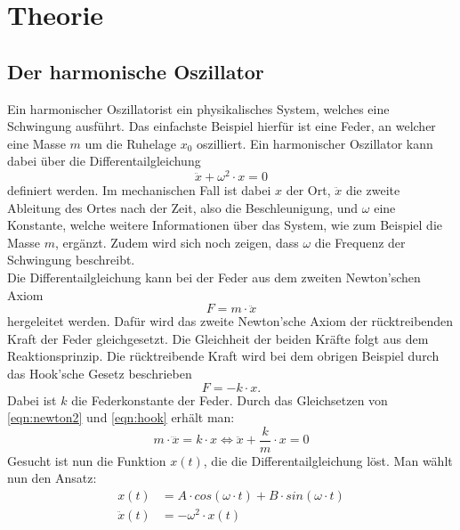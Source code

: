 \section{Theorie}
\label{sec:Theorie}
\subsection{Der harmonische Oszillator}
Ein harmonischer Oszillatorist ein physikalisches System, welches eine Schwingung ausführt. Das einfachste Beispiel
hierfür ist eine Feder, an welcher eine Masse  $m$ um die Ruhelage $x_0$ oszilliert.
Ein harmonischer Oszillator kann dabei über die Differentailgleichung
\begin{equation}
    \ddot{x}+\omega^2\cdot x=0 \label{eqn:harmOsz}
\end{equation}
definiert werden. Im mechanischen Fall ist dabei $x$ der Ort, $\ddot{x}$ die zweite Ableitung des Ortes nach der Zeit,
also die Beschleunigung, und $\omega$ eine Konstante, welche weitere Informationen über das System, wie zum Beispiel die 
Masse $m$, ergänzt. Zudem wird sich noch zeigen, dass $\omega$ die Frequenz der Schwingung beschreibt.
\\
Die Differentailgleichung kann bei der Feder aus dem zweiten Newton'schen Axiom
\begin{equation}
    F=m\cdot\ddot{x} \label{eqn:newton2}
\end{equation} 
hergeleitet werden. Dafür wird das zweite Newton'sche Axiom der rücktreibenden Kraft der Feder gleichgesetzt. Die 
Gleichheit der beiden Kräfte folgt aus dem Reaktionsprinzip. Die rücktreibende Kraft wird bei dem obrigen Beispiel
durch das Hook'sche Gesetz beschrieben
\begin{equation}
    F=-k\cdot x \label{eqn:hook}. %
\end{equation}
Dabei ist $k$ die Federkonstante der Feder.
Durch das Gleichsetzen von \eqref{eqn:newton2} und \eqref{eqn:hook} erhält man:
\begin{equation}
    m\cdot\dddot{x}=k\cdot x \Leftrightarrow \ddot{x}+\frac{k}{m}\cdot x=0 \label{eqn:dgl}
\end{equation}
Gesucht ist nun die Funktion $x(t)$, die die Differentailgleichung löst. Man wählt nun den Ansatz:
\begin{align}
    x(t)&=A\cdot cos(\omega\cdot t)+B\cdot sin(\omega\cdot t) \\
    \ddot{x}(t)&=-\omega^2\cdot x(t)
    \label{eqn:ansatz}
\end{align}
